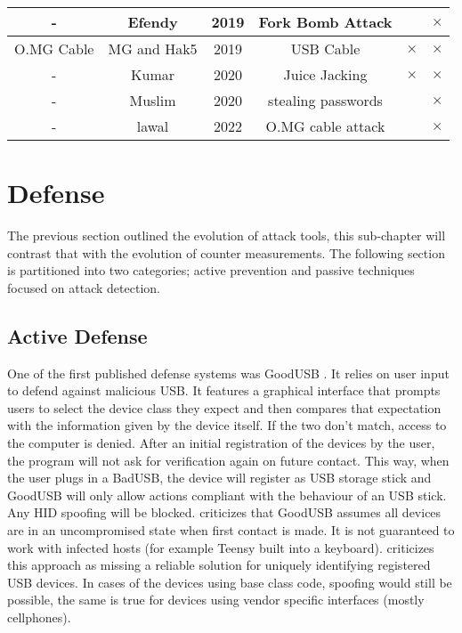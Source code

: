 {\begin{tabular}{|c c c c c c|}
 \hline
  - & Efendy\cite{efendyExploringPossibilityUSB2019} & 2019 & Fork Bomb Attack & & $\times$ \\
 \hline
 O.MG Cable & MG and Hak5  \cite{hak5MGCable} \cite{MGCable2019a} & 2019 & USB Cable & $\times$ & $\times$ \\
 \hline
- & Kumar \cite{kumarJuiceJackingUSB2020} & 2020 & Juice Jacking & $\times$ & $\times$ \\
\hline
- & Muslim \cite{muslimImplementationAnalysisUSB2020} & 2020 & stealing passwords & & $\times$ \\
\hline
-  & lawal \cite{lawalFacilitatingCyberenabledFraud2022} & 2022 & O.MG cable attack & & $\times$ \\
 \hline 
\end{tabular}
}%

\section{Defense} \label{HistoryOfDefense}

The previous section outlined the evolution of attack tools, this sub-chapter will contrast that with the evolution of counter measurements. 
The following section is partitioned into two categories; active prevention and passive techniques focused on attack detection.

\subsection{Active Defense}

One of the first published defense systems was GoodUSB \cite{tianDefendingMaliciousUSB2015}. It relies on user input to defend against malicious USB. It features a graphical interface that prompts users to select the device class they expect and then compares that expectation with the information given by the device itself. If the two don't match, access to the computer is denied. After an initial registration of the devices by the user, the program will not ask for verification again on future contact. This way, when the user plugs in a BadUSB, the device will register as USB storage stick and GoodUSB will only allow actions compliant with the behaviour of an USB stick. Any HID spoofing will be blocked.
\cite{nissimUSBbasedAttacks2017} criticizes that GoodUSB assumes all devices are in an uncompromised state when first contact is made. It is not guaranteed to work with infected hosts (for example Teensy built into a keyboard). 
\cite{mohammadmoradiMakingWhitelistingBasedDefense2018} criticizes this approach as missing a reliable solution for uniquely identifying registered USB devices. In cases of the devices using base class code, spoofing would still be possible, the same is true for devices using vendor specific interfaces (mostly cellphones). 

